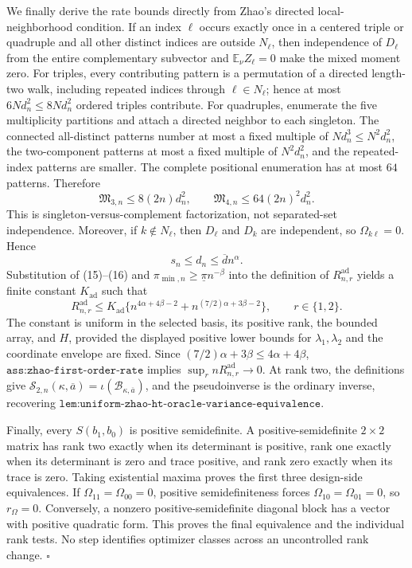 We finally derive the rate bounds directly from Zhao's directed local-neighborhood condition.  If an index \(\ell\) occurs exactly once in a centered triple or quadruple and all other distinct indices are outside \(N_\ell\), then independence of \(D_\ell\) from the entire complementary subvector and \(\mathbb E_\nu Z_\ell=0\) make the mixed moment zero.  For triples, every contributing pattern is a permutation of a directed length-two walk, including repeated indices through \(\ell\in N_\ell\); hence at most \(6Nd_n^2\le8Nd_n^2\) ordered triples contribute.  For quadruples, enumerate the five multiplicity partitions and attach a directed neighbor to each singleton.  The connected all-distinct patterns number at most a fixed multiple of \(Nd_n^3\le N^2d_n^2\), the two-component patterns at most a fixed multiple of \(N^2d_n^2\), and the repeated-index patterns are smaller.  The complete positional enumeration has at most \(64\) patterns.  Therefore
\[
\mathfrak M_{3,n}\le8(2n)d_n^2,
\qquad
\mathfrak M_{4,n}\le64(2n)^2d_n^2.
\tag{15}
\]
This is singleton-versus-complement factorization, not separated-set independence.  Moreover, if \(k\notin N_\ell\), then \(D_\ell\) and \(D_k\) are independent, so \(\Omega_{k\ell}=0\).  Hence
\[
s_n\le d_n\le\overline d n^\alpha.
\tag{16}
\]
Substitution of (15)--(16) and \(\pi_{\min,n}\ge\underline\pi n^{-\beta}\) into the definition of \(R_{n,r}^{\mathrm{ad}}\) yields a finite constant \(K_{\mathrm{ad}}\) such that
\[
R_{n,r}^{\mathrm{ad}}
\le K_{\mathrm{ad}}
\{n^{4\alpha+4\beta-2}
+n^{(7/2)\alpha+3\beta-2}\},
\qquad r\in\{1,2\}.
\tag{17}
\]
The constant is uniform in the selected basis, its positive rank, the bounded array, and \(H\), provided the displayed positive lower bounds for \(\lambda_1,\lambda_2\) and the coordinate envelope are fixed.  Since \((7/2)\alpha+3\beta\le4\alpha+4\beta\), \(\texttt{ass:zhao-first-order-rate}\) implies \(\sup_r nR_{n,r}^{\mathrm{ad}}\to0\).  At rank two, the definitions give \(\mathcal S_{2,n}(\kappa,\overline a)=\iota(\mathcal B_{\kappa,\overline a})\), and the pseudoinverse is the ordinary inverse, recovering \(\texttt{lem:uniform-zhao-ht-oracle-variance-equivalence}\).

Finally, every \(S(b_1,b_0)\) is positive semidefinite.  A positive-semidefinite \(2\times2\) matrix has rank two exactly when its determinant is positive, rank one exactly when its determinant is zero and trace positive, and rank zero exactly when its trace is zero.  Taking existential maxima proves the first three design-side equivalences.  If \(\Omega_{11}=\Omega_{00}=0\), positive semidefiniteness forces \(\Omega_{10}=\Omega_{01}=0\), so \(r_\Omega=0\).  Conversely, a nonzero positive-semidefinite diagonal block has a vector with positive quadratic form.  This proves the final equivalence and the individual rank tests.  No step identifies optimizer classes across an uncontrolled rank change. \(\square\)
